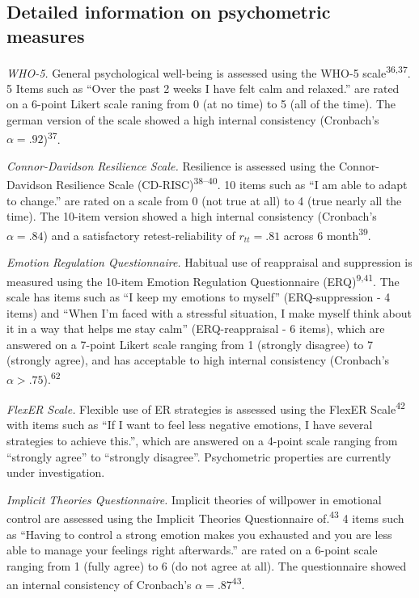\documentclass[
  english,
  man,floatsintext]{apa6}
\begin{document}


\newpage

\hypertarget{SupplementQuestionnaires}{%
\subsection{Detailed information on psychometric measures}\label{SupplementQuestionnaires}}

\emph{WHO-5.}
General psychological well-being is assessed using the WHO-5 scale\textsuperscript{36,37}.
5 Items such as ``Over the past 2 weeks I have felt calm and relaxed.'' are rated on a 6-point Likert scale raning from 0 (at no time) to 5 (all of the time).
The german version of the scale showed a high internal consistency (Cronbach's \(\alpha=.92\))\textsuperscript{37}.

\emph{Connor-Davidson Resilience Scale.}
Resilience is assessed using the Connor-Davidson Resilience Scale (CD-RISC)\textsuperscript{38--40}.
10 items such as ``I am able to adapt to change.'' are rated on a scale from 0 (not true at all) to 4 (true nearly all the time).
The 10-item version showed a high internal consistency (Cronbach's \(\alpha=.84\)) and a satisfactory retest-reliability of \(r_{tt}=.81\) across 6 month\textsuperscript{39}.

\emph{Emotion Regulation Questionnaire.}
Habitual use of reappraisal and suppression is measured using the 10-item Emotion Regulation Questionnaire (ERQ)\textsuperscript{9,41}.
The scale has items such as ``I keep my emotions to myself'' (ERQ-suppression - 4 items) and ``When I'm faced with a stressful situation, I make myself think about it in a way that helps me stay calm'' (ERQ-reappraisal - 6 items), which are answered on a 7-point Likert scale ranging from 1 (strongly disagree) to 7 (strongly agree), and has acceptable to high internal consistency (Cronbach's \(\alpha>.75\)).\textsuperscript{62}

\emph{FlexER Scale.}
Flexible use of ER strategies is assessed using the FlexER Scale\textsuperscript{42} with items such as ``If I want to feel less negative emotions, I have several strategies to achieve this.'', which are answered on a 4-point scale ranging from ``strongly agree'' to ``strongly disagree''.
Psychometric properties are currently under investigation.

\emph{Implicit Theories Questionnaire.}
Implicit theories of willpower in emotional control are assessed using the Implicit Theories Questionnaire of.\textsuperscript{43}
4 items such as ``Having to control a strong emotion makes you exhausted and you are less able to manage your feelings right afterwards.'' are rated on a 6-point scale ranging from 1 (fully agree) to 6 (do not agree at all).
The questionnaire showed an internal consistency of Cronbach's \(\alpha=.87\)\textsuperscript{43}.
\end{document}
